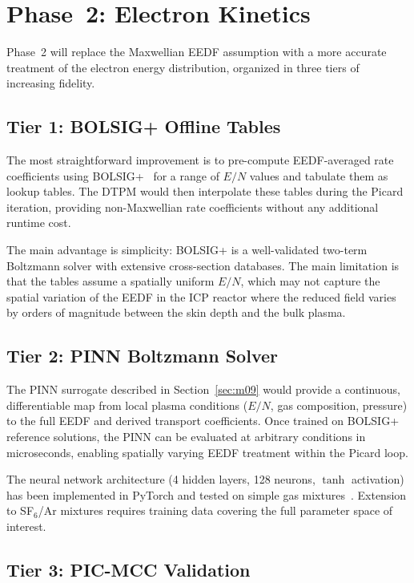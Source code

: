 \documentclass[11pt,a4paper]{report}
\begin{document}
\section{Phase~2: Electron Kinetics}
\label{sec:phase2}

Phase~2 will replace the Maxwellian EEDF assumption with a more accurate treatment of the electron energy distribution, organized in three tiers of increasing fidelity.

\subsection{Tier 1: BOLSIG+ Offline Tables}

The most straightforward improvement is to pre-compute EEDF-averaged rate coefficients using BOLSIG+~\cite{Hagelaar2005} for a range of $E/N$ values and tabulate them as lookup tables.  The DTPM would then interpolate these tables during the Picard iteration, providing non-Maxwellian rate coefficients without any additional runtime cost.

The main advantage is simplicity: BOLSIG+ is a well-validated two-term Boltzmann solver with extensive cross-section databases.  The main limitation is that the tables assume a spatially uniform $E/N$, which may not capture the spatial variation of the EEDF in the ICP reactor where the reduced field varies by orders of magnitude between the skin depth and the bulk plasma.

\subsection{Tier 2: PINN Boltzmann Solver}

The PINN surrogate described in Section~\ref{sec:m09} would provide a continuous, differentiable map from local plasma conditions ($E/N$, gas composition, pressure) to the full EEDF and derived transport coefficients.  Once trained on BOLSIG+ reference solutions, the PINN can be evaluated at arbitrary conditions in microseconds, enabling spatially varying EEDF treatment within the Picard loop.

The neural network architecture (4 hidden layers, 128 neurons, $\tanh$ activation) has been implemented in PyTorch and tested on simple gas mixtures~\cite{Kim2023}.  Extension to SF$_6$/Ar mixtures requires training data covering the full parameter space of interest.

\subsection{Tier 3: PIC-MCC Validation}
\end{document}
